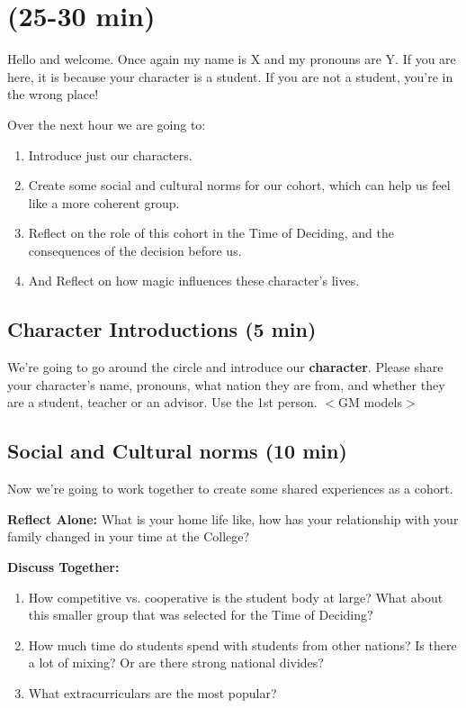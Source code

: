 \documentclass[green]{GL2020}
\begin{document}
\name{\gPreGameStudent{}}

\section*{(25-30 min)}

Hello and welcome. Once again my name is X and my pronouns are Y. If you are here, it is because your character is a student. If you are not a student, you're in the wrong place!

Over the next hour we are going to:
\begin{enumerate}
	\item Introduce just our characters.
	\item Create some social and cultural norms for our cohort, which can help us feel like a more coherent group.
	\item Reflect on the role of this cohort in the Time of Deciding, and the consequences of the decision before us.
	\item And Reflect on how magic influences these character’s lives.
\end{enumerate}

\subsection*{Character Introductions (5 min)}
We’re going to go around the circle and introduce our \textbf{character}. Please share your character’s name, pronouns, what nation they are from, and whether they are a student, teacher or an advisor. Use the 1st person. $<$GM models$>$

\subsection*{Social and Cultural norms (10 min)}
Now we’re going to work together to create some shared experiences as a cohort.

\textbf{Reflect Alone:} What is your home life like, how has your relationship with your family changed in your time at the College?

\textbf{Discuss Together:}
\begin{enumerate}
	\item How competitive vs. cooperative is the student body at large? What about this smaller group that was selected for the Time of Deciding?
	\item How much time do students spend with students from other nations? Is there a lot of mixing? Or are there strong national divides?
	\item What extracurriculars are the most popular?
\end{enumerate}
\end{document}
